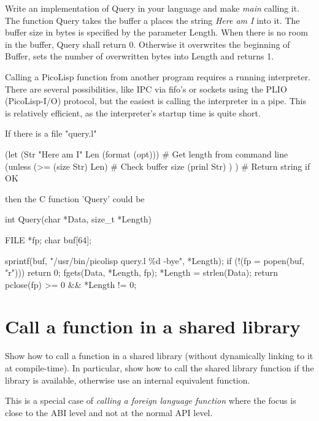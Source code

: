 Write an implementation of Query in your language and make \emph{main}
calling it. The function Query takes the buffer a places the string
\emph{Here am I} into it. The buffer size in bytes is specified by the
parameter Length. When there is no room in the buffer, Query shall
return 0. Otherwise it overwrites the beginning of Buffer, sets the
number of overwritten bytes into Length and returns 1.


\begin{wideverbatim}

Calling a PicoLisp function from another program requires a running interpreter.
There are several possibilities, like IPC via fifo's or sockets using the PLIO
(PicoLisp-I/O) protocol, but the easiest is calling the interpreter in a pipe.
This is relatively efficient, as the interpreter's startup time is quite short.

If there is a file "query.l"

(let (Str "Here am I"  Len (format (opt)))  # Get length from command line
   (unless (>= (size Str) Len)              # Check buffer size
      (prinl Str) ) )                       # Return string if OK

then the C function 'Query' could be

int Query(char *Data, size_t *Length) {
   FILE *fp;
   char buf[64];

   sprintf(buf, "/usr/bin/picolisp query.l \%d -bye", *Length);
   if (!(fp = popen(buf, "r")))
      return 0;
   fgets(Data, *Length, fp);
   *Length = strlen(Data);
   return pclose(fp) >= 0 \&\& *Length != 0;
}

\end{wideverbatim}

\pagebreak{}
\section*{Call a function in a shared library}

Show how to call a function in a shared library (without dynamically
linking to it at compile-time). In particular, show how to call the
shared library function if the library is available, otherwise use an
internal equivalent function.

This is a special case of \emph{calling a foreign language function}
where the focus is close to the ABI level and not at the normal API
level.

